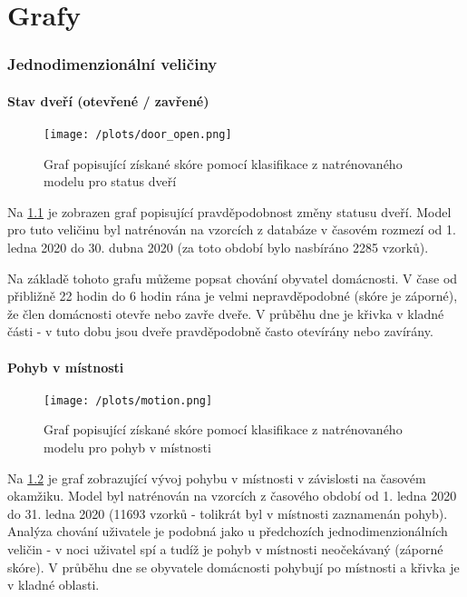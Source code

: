 \chapter{Grafy} \label{app:diagnostics}
\vspace*{-10mm}

\subsection*{Jednodimenzionální veličiny} \label{app_diagnostics_1D}

\subsubsection*{Stav dveří (otevřené / zavřené)}

\begin{figure}[H]
  \centering
  \texttt{[image: /plots/door\_open.png]}
  \caption{Graf popisující získané skóre pomocí klasifikace z natrénovaného modelu pro status dveří}
  \label{fig:app_door_open}
\end{figure}

Na \cref{fig:app_door_open} je zobrazen graf popisující pravděpodobnost změny statusu dveří. Model pro tuto veličinu byl natrénován na vzorcích z databáze v časovém rozmezí od 1. ledna 2020 do 30. dubna 2020 (za toto období bylo nasbíráno 2285 vzorků). \par
Na základě tohoto grafu můžeme popsat chování obyvatel domácnosti. V čase od přibližně 22 hodin do 6 hodin rána je velmi nepravděpodobné (skóre je záporné), že člen domácnosti otevře nebo zavře dveře. V průběhu dne je křivka v kladné části - v tuto dobu jsou dveře pravděpodobně často otevírány nebo zavírány. 

\subsubsection*{Pohyb v místnosti}

\begin{figure}[H]
  \centering
  \texttt{[image: /plots/motion.png]}
  \caption{Graf popisující získané skóre pomocí klasifikace z natrénovaného modelu pro pohyb v místnosti}
  \label{fig:app_motion}
\end{figure}

Na \cref{fig:app_motion} je graf zobrazující vývoj pohybu v místnosti v závislosti na časovém okamžiku. Model byl natrénován na vzorcích z časového období od 1. ledna 2020 do 31. ledna 2020 (11693 vzorků - tolikrát byl v místnosti zaznamenán pohyb). Analýza chování uživatele je podobná jako u předchozích jednodimenzionálních veličin - v noci uživatel spí a tudíž je pohyb v místnosti neočekávaný (záporné skóre). V průběhu dne se obyvatele domácnosti pohybují po místnosti a křivka je v kladné oblasti. 

